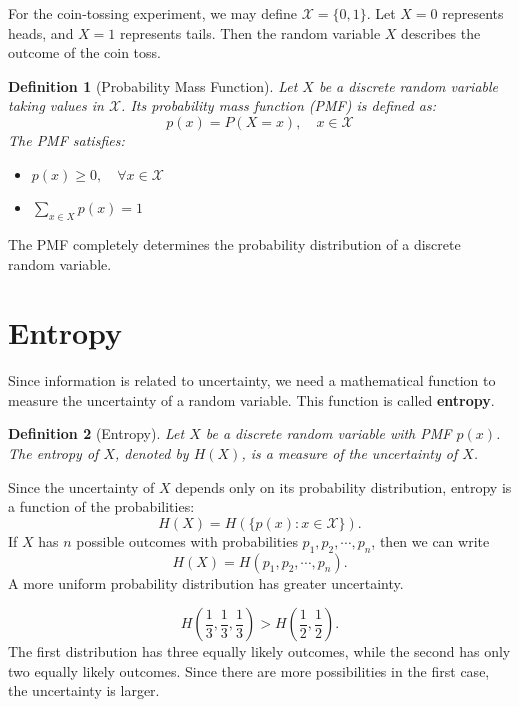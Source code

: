 \documentclass[11pt]{report}
\theoremstyle{lecturedefinition}
\newtheorem{definition}{Definition}
\theoremstyle{lectureremark}
\begin{document}
For the coin-tossing experiment, we may define $\mathcal{X}=\{0,1\}$. Let $X=0$ represents heads, and $X=1$ represents tails. Then the random variable $X$ describes the outcome of the coin toss.

\begin{definition}[Probability Mass Function]
Let $X$ be a discrete random variable taking values in $\mathcal{X}$. Its probability mass function (PMF) is defined as:
\[
p(x)=P(X=x),\quad x\in \mathcal{X}
\]
The PMF satisfies:
\begin{itemize}
    \item $p(x)\ge 0, \quad \forall x\in \mathcal{X}$
    \item $\sum_{x\in X}p(x)=1$
\end{itemize}
\end{definition}
The PMF completely determines the probability distribution of a discrete random variable.

\section{Entropy}
Since information is related to uncertainty, we need a mathematical function to measure the uncertainty of a random variable. This function is called \textbf{entropy}.

\begin{definition}[Entropy]
Let $X$ be a discrete random variable with PMF $p(x)$. The entropy of $X$, denoted by $H(X)$, is a measure of the uncertainty of $X$.
\end{definition}

Since the uncertainty of $X$ depends only on its probability distribution, entropy is a function of the probabilities:
\begin{equation}
    H(X) = H\left(\{p(x):x\in\mathcal{X}\}\right).
\end{equation}
If $X$ has $n$ possible outcomes with probabilities $p_1, p_2,\cdots, p_n$, then we can write
\begin{equation}
    H(X)=H(p_1, p_2,\cdots, p_n).
\end{equation}
A more uniform probability distribution has greater uncertainty.

\begin{ExampleBox}
\[
H(\frac{1}{3},\frac{1}{3},\frac{1}{3})>H(\frac{1}{2},\frac{1}{2}).
\]
The first distribution has three equally likely outcomes, while the second has only two equally likely outcomes. Since there are more possibilities in the first case, the uncertainty is larger.
\end{ExampleBox}
\end{document}
